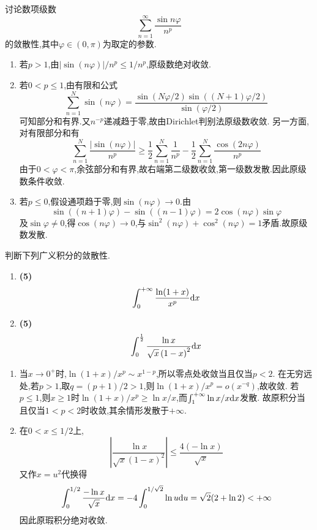 \documentclass{ctexart}
\begin{document}
\begin{problem}[5.(10\songti{分})]
讨论数项级数
        \[\sum_{n=1}^{\infty}\dfrac{\sin n\varphi}{n^p}\]
        的敛散性,其中$\varphi\in(0,\pi)$为取定的参数.
\end{problem}
\begin{solution}
\begin{enumerate}[label=\tbf{\roman*.},topsep=0pt,parsep=0pt,itemsep=0pt,partopsep=0pt,leftmargin=*]
\item 若$p>1$,由$|\sin(n\varphi)|/n^p\leqslant1/n^p$,原级数绝对收敛.
\item 若$0<p\leqslant1$,由有限和公式
\[\sum_{n=1}^N\sin(n\varphi)=\frac{\sin(N\varphi/2)\sin((N+1)\varphi/2)}{\sin(\varphi/2)}\]
可知部分和有界.又$n^{-p}$递减趋于零,故由Dirichlet判别法原级数收敛.
另一方面,对有限部分和有
\[\sum_{n=1}^N\frac{|\sin(n\varphi)|}{n^p}
\geqslant\frac12\sum_{n=1}^N\frac1{n^p}
-\frac12\sum_{n=1}^N\frac{\cos(2n\varphi)}{n^p}\]
由于$0<\varphi<\pi$,余弦部分和有界,故右端第二级数收敛,第一级数发散.因此原级数条件收敛.
\item 若$p\leqslant0$,假设通项趋于零,则$\sin(n\varphi)\to0$.由
\[\sin((n+1)\varphi)-\sin((n-1)\varphi)=2\cos(n\varphi)\sin\varphi\]
及$\sin\varphi\neq0$,得$\cos(n\varphi)\to0$,与$\sin^2(n\varphi)+\cos^2(n\varphi)=1$矛盾.故原级数发散.
\end{enumerate}
\end{solution}

\begin{problem}[6.(10\songti{分})]
判断下列广义积分的敛散性.
        \begin{enumerate}[label=\tbf{(\arabic*)},topsep=0pt,parsep=0pt,itemsep=0pt,partopsep=0pt]
            \item \textbf{(5)}
                \[\int_0^{+\infty}\dfrac{\ln(1+x)}{x^p}\mathrm{d} x\]
            \item \textbf{(5)}
                \[\int_0^{\frac12}\dfrac{\ln x}{\sqrt{x}\left(1-x\right)^2}\mathrm{d} x\]

        \end{enumerate}
\end{problem}
\begin{solution}
\begin{enumerate}[label=\tbf{(\arabic*)},topsep=0pt,parsep=0pt,itemsep=0pt,partopsep=0pt]
\item 当$x\to0^+$时,$\ln(1+x)/x^p\sim x^{1-p}$,所以零点处收敛当且仅当$p<2$.
在无穷远处,若$p>1$,取$q=(p+1)/2>1$,则$\ln(1+x)/x^p=o(x^{-q})$,故收敛.
若$p\leqslant1$,则$x\geqslant1$时$\ln(1+x)/x^p\geqslant\ln x/x$,而$\int_1^{+\infty}\ln x/x\mathrm{d} x$发散.
故原积分当且仅当$1<p<2$时收敛,其余情形发散于$+\infty$.
\item 在$0<x\leqslant1/2$上,
\[\left|\frac{\ln x}{\sqrt x(1-x)^2}\right|\leqslant\frac{4(-\ln x)}{\sqrt x}\]
又作$x=u^2$代换得
\[\int_0^{1/2}\frac{-\ln x}{\sqrt x}\mathrm{d} x
=-4\int_0^{1/\sqrt2}\ln u\mathrm{d} u=\sqrt2(2+\ln2)<+\infty\]
因此原瑕积分绝对收敛.
\end{enumerate}
\end{solution}
\end{document}
